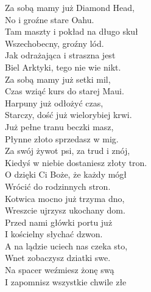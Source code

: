 Za sobą mamy już Diamond Head, \\
No i groźne stare Oahu. \\
Tam maszty i pokład na długo skuł \\
Wszechobecny, groźny lód. \\
Jak odrażająca i straszna jest \\
Biel Arktyki, tego nie wie nikt. \\
Za sobą mamy już setki mil, \\
Czas wziąć kurs do starej Maui. \\

Harpuny już odłożyć czas, \\
Starczy, dość już wielorybiej krwi. \\
Już pełne tranu beczki masz, \\
Płynne złoto sprzedasz w mig. \\
Za swój żywot psi, za trud i znój, \\
Kiedyś w niebie dostaniesz złoty tron. \\
O dzięki Ci Boże, że każdy mógł \\
Wrócić do rodzinnych stron. \\

Kotwica mocno już trzyma dno, \\
Wreszcie ujrzysz ukochany dom. \\
Przed nami główki portu już \\
I kościelny słychać dzwon. \\
A na lądzie uciech nas czeka sto, \\
Wnet zobaczysz dziatki swe. \\
Na spacer weźmiesz żonę swą \\
I zapomnisz wszystkie chwile złe